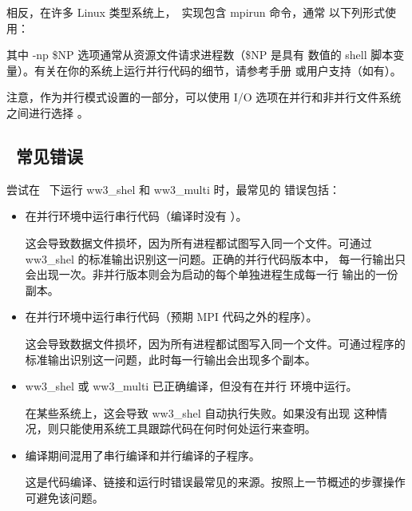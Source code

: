 
\noindent
相反，在许多 Linux 类型系统上，\mpi\ 实现包含 {\file mpirun} 命令，通常
以下列形式使用：


\noindent
其中 {\code -np \$NP} 选项通常从资源文件请求进程数（{\code \$NP} 是具有
数值的 shell 脚本变量）。有关在你的系统上运行并行代码的细节，请参考手册
或用户支持（如有）。

注意，作为并行模式设置的一部分，可以使用 I/O 选项在并行和非并行文件系统
之间进行选择 \citep[另见][]{tol:MMAB03a}。


\vssub
\subsection{~常见错误}
\vssub

尝试在 \mpi\ 下运行 {\file ww3\_shel} 和 {\file ww3\_multi} 时，最常见的
错误包括：

\begin{itemize}
\item 在并行环境中运行串行代码（编译时没有 \mpi）。 \\ \vspace{-3mm}

   这会导致数据文件损坏，因为所有进程都试图写入同一个文件。可通过
   {\file ww3\_shel} 的标准输出识别这一问题。正确的并行代码版本中，
   每一行输出只会出现一次。非并行版本则会为启动的每个单独进程生成每一行
   输出的一份副本。

\item 在并行环境中运行串行代码（预期 MPI 代码之外的程序）。
   \\ \vspace{-3mm}

   这会导致数据文件损坏，因为所有进程都试图写入同一个文件。可通过程序的
   标准输出识别这一问题，此时每一行输出会出现多个副本。

\item {\file ww3\_shel} 或 {\file ww3\_multi} 已正确编译，但没有在并行
   环境中运行。 \\ \vspace{-3mm}

   在某些系统上，这会导致 {\code ww3\_shel} 自动执行失败。如果没有出现
   这种情况，则只能使用系统工具跟踪代码在何时何处运行来查明。

\item 编译期间混用了串行编译和并行编译的子程序。
      \\ \vspace{-3mm}

   这是代码编译、链接和运行时错误最常见的来源。按照上一节概述的步骤操作
   可避免该问题。

\end{itemize}



